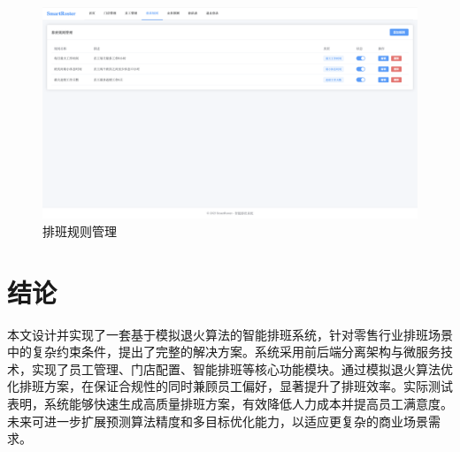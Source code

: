 \documentclass{ctexart}
\begin{document}
\begin{figure}[H]
    \centering
    \includegraphics[width=0.8\linewidth]{./source/排班规则管理.png}
    \caption{排班规则管理}
    \label{fig:microservice-arch}
\end{figure}




\section{结论}
本文设计并实现了一套基于模拟退火算法的智能排班系统，针对零售行业排班场景中的复杂约束条件，提出了完整的解决方案。系统采用前后端分离架构与微服务技术，实现了员工管理、门店配置、智能排班等核心功能模块。通过模拟退火算法优化排班方案，在保证合规性的同时兼顾员工偏好，显著提升了排班效率。实际测试表明，系统能够快速生成高质量排班方案，有效降低人力成本并提高员工满意度。未来可进一步扩展预测算法精度和多目标优化能力，以适应更复杂的商业场景需求。




\appendix
{}

\end{document}
